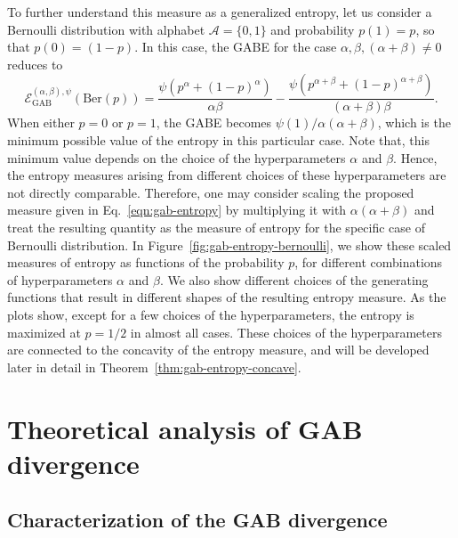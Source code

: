 \documentclass[11pt]{article}
\theoremstyle{plain}
\theoremstyle{remark}
\newcommand{\Acal}{\mathcal{A}}
\newcommand{\eGAB}{\mathcal{E}_{\mathrm{GAB}}}
\begin{document}
To further understand this measure as a generalized entropy, let us consider a Bernoulli distribution with alphabet $\Acal = \{0, 1\}$ and probability $p(1) = p$, so that $p(0) = (1-p)$. In this case, the GABE for the case $\alpha,\beta, (\alpha+\beta) \neq 0$ reduces to
\begin{equation*}
    \eGAB^{(\alpha,\beta), \psi}(\text{Ber}(p))
    = \frac{\psi(p^\alpha + (1-p)^\alpha)}{\alpha\beta} - \frac{\psi(p^{\alpha+\beta} + (1-p)^{\alpha+\beta})}{(\alpha+\beta)\beta}.
\end{equation*}
\noindent When either $p = 0$ or $p = 1$, the GABE becomes $\psi(1)/\alpha(\alpha+\beta)$, which is the minimum possible value of the entropy in this particular case. Note that, this minimum value depends on the choice of the hyperparameters $\alpha$ and $\beta$. Hence, the entropy measures arising from different choices of these hyperparameters are not directly comparable. Therefore, one may consider scaling the proposed measure given in Eq.~\eqref{eqn:gab-entropy} by multiplying it with $\alpha(\alpha+\beta)$ and treat the resulting quantity as the measure of entropy for the specific case of Bernoulli distribution. In Figure~\ref{fig:gab-entropy-bernoulli}, we show these scaled measures of entropy as functions of the probability $p$, for different combinations of hyperparameters $\alpha$ and $\beta$. We also show different choices of the generating functions that result in different shapes of the resulting entropy measure. As the plots show, except for a few choices of the hyperparameters, the entropy is maximized at $p = 1/2$ in almost all cases. These choices of the hyperparameters are connected to the concavity of the entropy measure, and will be developed later in detail in Theorem~\ref{thm:gab-entropy-concave}.


\section{Theoretical analysis of GAB divergence}\label{sec:gab-analysis}

\subsection{Characterization of the GAB divergence}\label{sec:gab-char}
\end{document}
